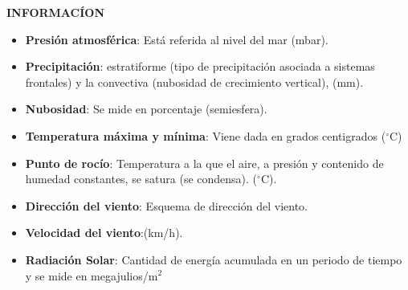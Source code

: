 \documentclass[[a4paper,landscape]{article}\usepackage[]{graphicx}\usepackage[]{color}
\begin{document}
\begin{footnotesize}
\textbf{\textcolor{meteoblue}{INFORMAC\'ION}}
\begin{itemize}
    \item \textbf{Presi\'on atmosf\'erica}: Está referida al nivel del mar (mbar).
    \item \textbf{Precipitaci\'on}: estratiforme (tipo de precipitaci\'on asociada a sistemas frontales)
            y la convectiva (nubosidad de crecimiento vertical), (mm).
    \item \textbf{Nubosidad}: Se mide en porcentaje (semiesfera).
    \item \textbf{Temperatura m\'axima y m\'inima}: Viene dada en grados centigrados ($^\circ$C)
    \item \textbf{Punto de roc\'io}: Temperatura a la que el aire, a presi\'on y contenido de humedad constantes,
            se satura (se condensa). ($^\circ$C).
    \item \textbf{Direcci\'on del viento}: Esquema de direcci\'on del viento.
    \item \textbf{Velocidad del viento}:(km/h).
    \item \textbf{Radiaci\'on Solar}: Cantidad de energía acumulada en un periodo de tiempo y se mide en megajulios/m$^2$
\end{itemize}
\end{footnotesize}




\end{document}

